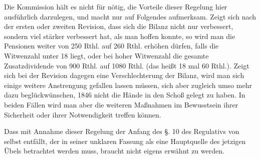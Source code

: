 Die Kommission hält es nicht für nötig, die Vorteile dieser Regelung hier ausführlich darzulegen, und macht nur auf Folgendes aufmerksam. Zeigt sich nach der ersten oder zweiten Revision, dass sich die Bilanz nicht nur verbessert, sondern viel stärker verbessert hat, als man hoffen konnte, so wird man die Pensionen weiter von 250 Rthl. auf 260 Rthl. erhöhen dürfen, falls die Witwenzahl unter 18 liegt, oder bei hoher Witwenzahl die gesamte Zusatzdividende von 900 Rthl. auf 1080 Rthl. (das heißt 18 mal 60 Rthl.). Zeigt sich bei der Revision dagegen eine Verschlechterung der Bilanz, wird man sich einige weitere Anstrengung gefallen lassen müssen, sich aber zugleich umso mehr dazu beglückwünschen, 1846 nicht die Hände in den Schoß gelegt zu haben. In beiden Fällen wird man aber die weiteren Maßnahmen im Bewusstsein ihrer Sicherheit oder ihrer Notwendigkeit treffen können.

Dass mit Annahme dieser Regelung der Anfang des §. 10 des Regulativs von selbst entfällt, der in seiner unklaren Fassung als eine Hauptquelle des jetzigen Übels betrachtet werden muss, braucht nicht eigens erwähnt zu werden.

